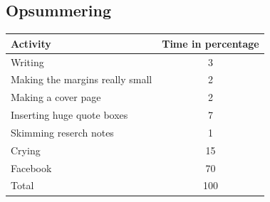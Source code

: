 \subsection{Opsummering}

\begin{table}[h]
\begin{tabular}{@{}lc@{}}
\toprule
\textbf{Activity}                                    & \multicolumn{1}{l}{\textbf{Time in percentage}} \\ \midrule
\multicolumn{1}{l|}{Writing}                         & 3                                               \\
\multicolumn{1}{l|}{Making the margins really small} & 2                                               \\
\multicolumn{1}{l|}{Making a cover page}             & 2                                               \\
\multicolumn{1}{l|}{Inserting huge quote boxes}      & 7                                               \\
\multicolumn{1}{l|}{Skimming reserch notes}          & 1                                               \\
\multicolumn{1}{l|}{Crying}                          & 15                                              \\
\multicolumn{1}{l|}{Facebook}                        & 70                                              \\ \midrule
Total                                                & 100                                             \\ \bottomrule
\end{tabular}
\end{table}




